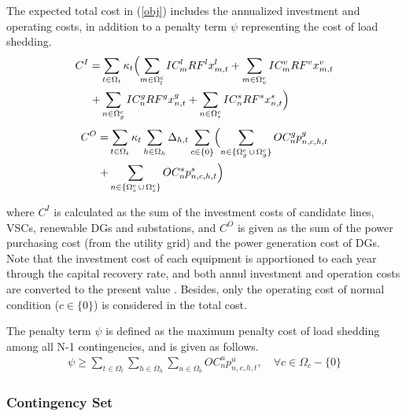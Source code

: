 \documentclass[a4paper,fleqn]{cas-dc}
\begin{document}
The expected total cost in (\ref{obj}) {\color{blue}includes} the annualized 
investment and operating costs, {\color{blue} in addition to} a penalty term $ \psi $ 
representing the cost of load shedding.
\begin{align}
    \label{IC}
    \begin{aligned} 
        C^{I} = & \sum_{t \in \Omega_{t}} \kappa_{t} \Bigl(
        \sum_{m \in \Omega_{l}^{c}} IC_{m}^{l} RF^{l} x_{m,t}^{l} + 
        \sum_{m \in \Omega_{v}^{c}} IC_{m}^{v} RF^{v} x_{m,t}^{v} \\ + &
        \sum_{n \in \Omega_{g}^{c}} IC_{n}^{g} RF^{g} x_{n,t}^{g} + 
        \sum_{n \in \Omega_{s}^{c}} IC_{n}^{s} RF^{s} x_{n,t}^{s} \Bigr)
    \end{aligned}
\end{align}
\begin{align}
  \label{OC}
  \begin{aligned}
  C^{O} = & \sum_{t \in \Omega_{t}} \kappa_{t} \sum_{h \in \Omega_{h}} 
  \Delta_{h,t} \sum_{c \in \{0\}} \Bigl(
  \sum_{n \in \{\Omega_{g}^{e} \, \cup \, \Omega_{g}^{c}\}} 
  OC_{n}^{g} p_{n,c,h,t}^{g} \\ + &
  \sum_{n \in \{\Omega_{s}^{e} \, \cup \, \Omega_{s}^{c}\}} 
  OC_{n}^{s} p_{n,c,h,t}^{s} \Bigr)
  \end{aligned}
\end{align}

\noindent where $ C^{I} $ is calculated as the sum of the investment costs of 
candidate lines, VSCs, renewable DGs and substations, and $ C^{O} $ is 
given as the sum of the power purchasing cost (from the utility grid) and the 
power generation cost of DGs. Note that 
{\color{blue}
the investment cost of each equipment is apportioned to each year through the 
capital recovery rate, and both annul investment and operation costs are 
converted to the present value \cite{Muñoz-Delgado_2015_Joint}. Besides, 
}
only the operating cost of normal 
condition ($ c \in \{0\} $) {\color{blue}is} considered in the total cost.

The penalty term $ \psi $ is defined as the maximum penalty cost of load 
shedding among all N-1 contingencies, and is given as follows.
\begin{align}
    \label{psi}
    \psi \geq 
    \sum_{t \in \Omega_{t}} \sum_{h \in \Omega_{h}}
    \sum_{n \in \Omega_{b}} 
    OC_{n}^{u} p_{n,c,h,t}^{u},
    \quad \forall c \in \Omega_{c} - \{0\}
\end{align}

{\color{blue}
\subsubsection{Contingency Set}
}
\end{document}
